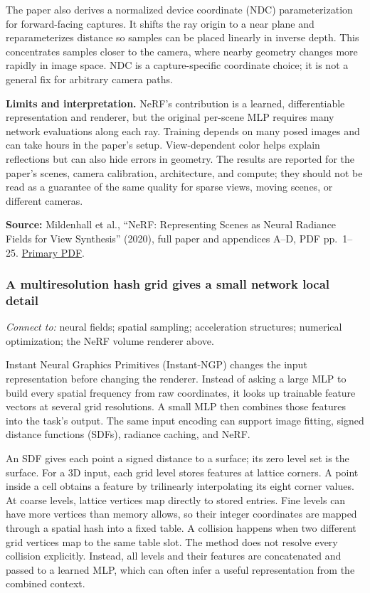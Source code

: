 The paper also derives a normalized device coordinate (NDC) parameterization for forward-facing captures. It shifts the ray origin to a near plane and reparameterizes distance so samples can be placed linearly in inverse depth. This concentrates samples closer to the camera, where nearby geometry changes more rapidly in image space. NDC is a capture-specific coordinate choice; it is not a general fix for arbitrary camera paths.

\textbf{Limits and interpretation.} NeRF's contribution is a learned, differentiable representation and renderer, but the original per-scene MLP requires many network evaluations along each ray. Training depends on many posed images and can take hours in the paper's setup. View-dependent color helps explain reflections but can also hide errors in geometry. The results are reported for the paper's scenes, camera calibration, architecture, and compute; they should not be read as a guarantee of the same quality for sparse views, moving scenes, or different cameras.

\textbf{Source:} Mildenhall et al., ``NeRF: Representing Scenes as Neural Radiance Fields for View Synthesis'' (2020), full paper and appendices A--D, PDF pp.~1--25. \href{https://arxiv.org/pdf/2003.08934}{Primary PDF}.

\subsubsection{A multiresolution hash grid gives a small network local detail}\label{04-visual-computing-ii-ch034-a-multiresolution-hash-grid-gives-a-small-network-local-detail}

\emph{Connect to:} neural fields; spatial sampling; acceleration structures; numerical optimization; the NeRF volume renderer above.

Instant Neural Graphics Primitives (Instant-NGP) changes the input representation before changing the renderer. Instead of asking a large MLP to build every spatial frequency from raw coordinates, it looks up trainable feature vectors at several grid resolutions. A small MLP then combines those features into the task's output. The same input encoding can support image fitting, signed distance functions (SDFs), radiance caching, and NeRF.

An SDF gives each point a signed distance to a surface; its zero level set is the surface. For a 3D input, each grid level stores features at lattice corners. A point inside a cell obtains a feature by trilinearly interpolating its eight corner values. At coarse levels, lattice vertices map directly to stored entries. Fine levels can have more vertices than memory allows, so their integer coordinates are mapped through a spatial hash into a fixed table. A collision happens when two different grid vertices map to the same table slot. The method does not resolve every collision explicitly. Instead, all levels and their features are concatenated and passed to a learned MLP, which can often infer a useful representation from the combined context.

